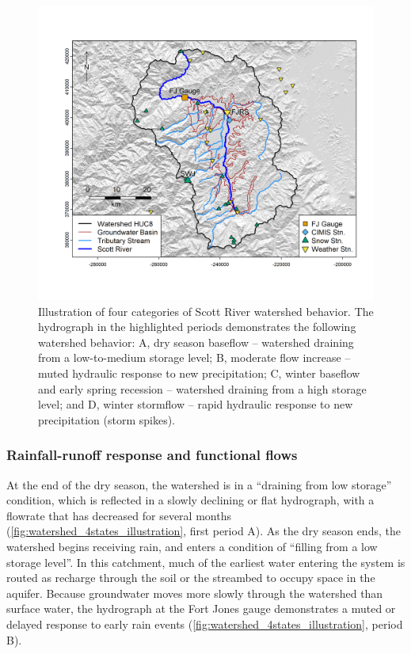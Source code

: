 \documentclass[hess, manuscript]{copernicus}
\begin{document}
\begin{figure}
\includegraphics[width=1\linewidth]{f01} \caption{\label{fig:watershed_4states_illustration} Illustration of four categories of Scott River watershed behavior. The hydrograph in the highlighted periods demonstrates the following watershed behavior: A, dry season baseflow -- watershed draining from a low-to-medium storage level; B, moderate flow increase  -- muted hydraulic response to new precipitation; C, winter baseflow and early spring recession -- watershed draining from a high storage level; and D, winter stormflow -- rapid hydraulic response to new precipitation (storm spikes).}\label{fig:watershed_4states_illustration}
\end{figure}

\subsubsection{Rainfall-runoff response and functional flows}

At the end of the dry season, the watershed is in a ``draining from low
storage'' condition, which is reflected in a slowly declining or flat
hydrograph, with a flowrate that has decreased for several months
(\autoref{fig:watershed_4states_illustration}, first period A). As the
dry season ends, the watershed begins receiving rain, and enters a
condition of ``filling from a low storage level''. In this catchment,
much of the earliest water entering the system is routed as recharge
through the soil or the streambed to occupy space in the aquifer.
Because groundwater moves more slowly through the watershed than surface
water, the hydrograph at the Fort Jones gauge demonstrates a muted or
delayed response to early rain events
(\autoref{fig:watershed_4states_illustration}, period B).
\end{document}
